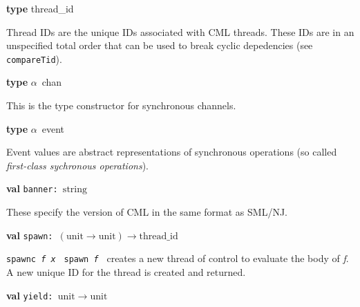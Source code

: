 \begin{descr}
\item {}{\textbf{type}} thread\_\linebreak[0]id\label{ty-CML.thread_id}

\begin{speccomment}
\item 

	  Thread IDs are the unique IDs associated with CML threads.\- 	  These IDs are in an unspecified total order that can be used to 	  break cyclic depedencies (see \texttt{compare\-Tid}).\-     \end{speccomment}
\item {}{\textbf{type}} \(\alpha\)~chan\label{ty-CML.chan}

\begin{speccomment}
\item 

          This is the type constructor for synchronous channels.\-     \end{speccomment}
\item {}{\textbf{type}} \(\alpha\)~event\label{ty-CML.event}

\begin{speccomment}
\item 

	  Event values are abstract representations of synchronous operations 	  (so called \emph{first-class sychronous operations}).\-     \end{speccomment}
\item {}{\textbf{val}} {\tt banner: \(\mathrm{string}\)}\label{val-CML.banner}


\begin{speccomment}
\item 

	These specify the version of CML in the same format as SML/NJ.\-     \end{speccomment}
\item {}{\textbf{val}} {\tt spawn: \((\mathrm{unit}\rightarrow \mathrm{unit})\rightarrow \mathrm{thread\_id}\)}\label{val-CML.spawn}


\begin{speccomment}
\item {\tt spawnc \textit{f} \textit{x} 	}\linebreak
{\tt           spawn \textit{f}         } 
creates a new thread of control to evaluate the body of \textit{f}.\- 	A new unique ID for the thread is created and returned.\-     \end{speccomment}
\item {}{\textbf{val}} {\tt yield: \(\mathrm{unit}\rightarrow \mathrm{unit}\)}\label{val-CML.yield}



\end{descr}
